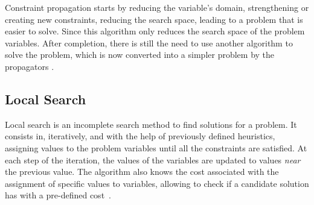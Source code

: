 Constraint propagation starts by reducing the variable's domain, strengthening or creating new constraints, reducing the search space, leading to a problem that is easier to solve. Since this algorithm only reduces the search space of the problem variables. After completion, there is still the need to use another algorithm to solve the problem, which is now converted into a simpler problem by the propagators \cite{Lecoutre2010}. 

\subsection{Local Search}

Local search is an incomplete search method to find solutions for a problem. It consists in, iteratively, and with the help of previously defined heuristics, assigning values to the problem variables until all the constraints are satisfied. At each step of the iteration, the values of the variables are updated to values \emph{near} the previous value. The algorithm also knows the cost associated with the assignment of specific values to variables, allowing to check if a candidate solution has with a pre-defined cost~\cite{Dechter2003}.